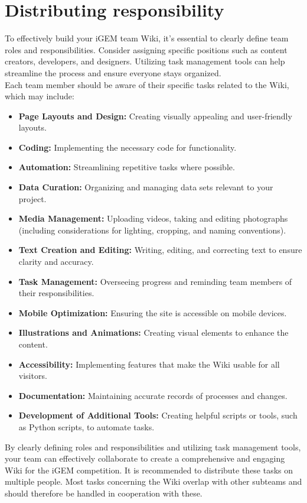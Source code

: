     \section{Distributing responsibility} \label{sec:distributing-responsibility}
    To effectively build your iGEM team Wiki, it’s essential to clearly define team roles and responsibilities.
    Consider assigning specific positions such as content creators, developers, and designers.
    Utilizing task management tools can help streamline the process and ensure everyone stays organized. \\
    Each team member should be aware of their specific tasks related to the Wiki, which may include:
    \begin{itemize}
        \item \textbf{Page Layouts and Design:} Creating visually appealing and user-friendly layouts.
        \item \textbf{Coding:} Implementing the necessary code for functionality.
        \item \textbf{Automation:} Streamlining repetitive tasks where possible.
        \item \textbf{Data Curation:} Organizing and managing data sets relevant to your project.
        \item \textbf{Media Management:} Uploading videos, taking and editing photographs (including considerations for lighting, cropping, and naming conventions).
        \item \textbf{Text Creation and Editing:} Writing, editing, and correcting text to ensure clarity and accuracy.
        \item \textbf{Task Management:} Overseeing progress and reminding team members of their responsibilities.
        \item \textbf{Mobile Optimization:} Ensuring the site is accessible on mobile devices.
        \item \textbf{Illustrations and Animations:} Creating visual elements to enhance the content.
        \item \textbf{Accessibility:} Implementing features that make the Wiki usable for all visitors.
        \item \textbf{Documentation:} Maintaining accurate records of processes and changes.
        \item \textbf{Development of Additional Tools:} Creating helpful scripts or tools, such as Python scripts, to automate tasks.
    \end{itemize}
    By clearly defining roles and responsibilities and utilizing task management tools, your team can effectively collaborate to create a comprehensive and engaging Wiki for the iGEM competition.
    It is recommended to distribute these tasks on multiple people. \newline
    Most tasks concerning the Wiki overlap with other subteams and should therefore be handled in cooperation with 
    these. \\ \newline
    
    

